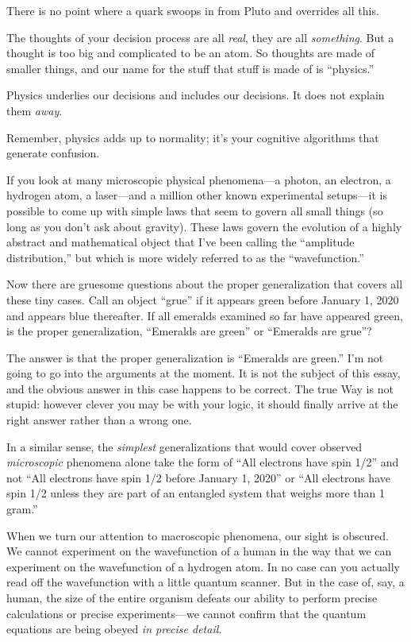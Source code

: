 {
 There is no point where a quark swoops in from Pluto and overrides
all this.}

{
 The thoughts of your decision process are all \textit{real}, they
are all \textit{something}. But a thought is too big and complicated to
be an atom. So thoughts are made of smaller things, and our name for
the stuff that stuff is made of is
``physics.''}

{
 Physics underlies our decisions and includes our decisions. It
does not explain them \textit{away}.}

{
 Remember, physics adds up to normality; it's your
cognitive algorithms that generate confusion.}

\myendsectiontext


{
 If you look at many microscopic physical phenomena---a photon, an
electron, a hydrogen atom, a laser---and a million other known
experimental setups---it is possible to come up with simple laws that
seem to govern all small things (so long as you don't
ask about gravity). These laws govern the evolution of a highly
abstract and mathematical object that I've been calling
the ``amplitude distribution,'' but
which is more widely referred to as the
``wavefunction.'' }

{
 Now there are gruesome questions about the proper generalization
that covers all these tiny cases. Call an object
``grue'' if it appears green before
January 1, 2020 and appears blue thereafter. If all emeralds examined
so far have appeared green, is the proper generalization,
``Emeralds are green'' or
``Emeralds are grue''?}

{
 The answer is that the proper generalization is
``Emeralds are green.''
I'm not going to go into the arguments at the moment.
It is not the subject of this essay, and the obvious answer in this
case happens to be correct. The true Way is not stupid: however clever
you may be with your logic, it should finally arrive at the right
answer rather than a wrong one.}

{
 In a similar sense, the \textit{simplest} generalizations that
would cover observed \textit{microscopic} phenomena alone take the form
of ``All electrons have spin 1/2''
and not ``All electrons have spin 1/2 before January
1, 2020'' or ``All electrons have
spin 1/2 unless they are part of an entangled system that weighs more
than 1 gram.''}

{
 When we turn our attention to macroscopic phenomena, our sight is
obscured. We cannot experiment on the wavefunction of a human in the
way that we can experiment on the wavefunction of a hydrogen atom. In
no case can you actually read off the wavefunction with a little
quantum scanner. But in the case of, say, a human, the size of the
entire organism defeats our ability to perform precise calculations or
precise experiments---we cannot confirm that the quantum equations are
being obeyed \textit{in precise detail.}}

